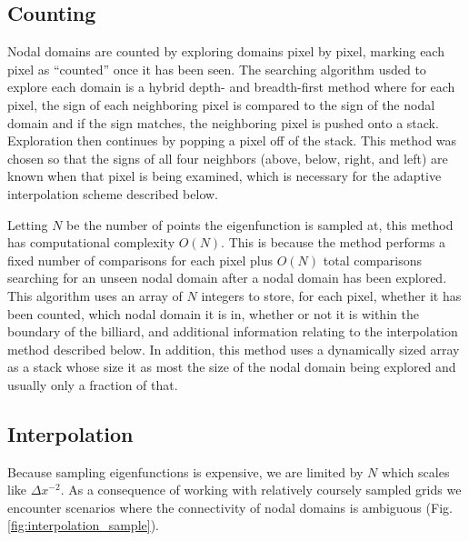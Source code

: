 \documentclass{article}
\begin{document}
\subsection*{Counting}
Nodal domains are counted by exploring domains pixel by pixel, marking each pixel as ``counted'' once it has been seen. The searching algorithm usded to explore each domain is a hybrid depth- and breadth-first method where for each pixel, the sign of each neighboring pixel is compared to the sign of the nodal domain and if the sign matches, the neighboring pixel is pushed onto a stack. Exploration then continues by popping a pixel off of the stack. This method was chosen so that the signs of all four neighbors (above, below, right, and left) are known when that pixel is being examined, which is necessary for the adaptive interpolation scheme described below.

Letting $N$ be the number of points the eigenfunction is sampled at, this method has computational complexity $O(N)$. This is because the method performs a fixed number of comparisons for each pixel plus $O(N)$ total comparisons searching for an unseen nodal domain after a nodal domain has been explored. This algorithm uses an array of $N$ integers to store, for each pixel, whether it has been counted, which nodal domain it is in, whether or not it is within the boundary of the billiard, and additional information relating to the interpolation method described below. In addition, this method uses a dynamically sized array as a stack whose size it as most the size of the nodal domain being explored and usually only a fraction of that.

\subsection*{Interpolation}
Because sampling eigenfunctions is expensive, we are limited by $N$ which scales like $\Delta x ^{-2}$. As a consequence of working with relatively coursely sampled grids we encounter scenarios where the connectivity of nodal domains is ambiguous (Fig. \ref{fig:interpolation_sample}).
\end{document}
